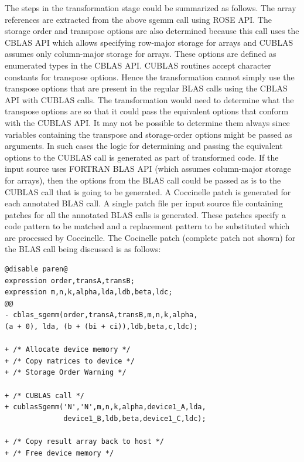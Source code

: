 \documentclass[12pt,a4paper]{article}
\begin{document}
The steps in the transformation stage could be summarized as follows. The array references are extracted from the above sgemm call using ROSE API. The storage order and transpose options are also determined because this call uses the CBLAS API which allows specifying row-major storage for arrays and CUBLAS assumes only column-major storage for arrays. These options are defined as enumerated types in the CBLAS API. CUBLAS routines accept character constants for transpose options. Hence the transformation cannot simply use the transpose options that are present in the regular BLAS calls using the CBLAS API with CUBLAS calls. The transformation would need to determine what the transpose options are so that it could pass the equivalent options that conform with the CUBLAS API. It may not be possible  to determine them always since variables containing the transpose and storage-order options might be passed as arguments. In such cases the logic for determining and passing the equivalent options to the CUBLAS call is generated as part of transformed code. If the input source uses FORTRAN BLAS API (which assumes column-major storage for arrays), then the options from the BLAS call could be passed as is to the CUBLAS call that is going to be generated. A Coccinelle patch is generated for each annotated BLAS call. A single patch file per input source file containing patches for all the annotated BLAS calls is generated. These patches specify a code pattern to be matched and a replacement pattern to be substituted which are processed by Coccinelle. The Cocinelle patch (complete patch not shown) for the BLAS call being discussed is as follows: 
\begin{verbatim}
@disable paren@ 
expression order,transA,transB;  
expression m,n,k,alpha,lda,ldb,beta,ldc; 
@@ 
- cblas_sgemm(order,transA,transB,m,n,k,alpha,
(a + 0), lda, (b + (bi + ci)),ldb,beta,c,ldc); 

+ /* Allocate device memory */ 
+ /* Copy matrices to device */ 
+ /* Storage Order Warning */ 

+ /* CUBLAS call */ 
+ cublasSgemm('N','N',m,n,k,alpha,device1_A,lda,
              device1_B,ldb,beta,device1_C,ldc); 
              
+ /* Copy result array back to host */ 
+ /* Free device memory */ 
\end{verbatim}
\end{document}
